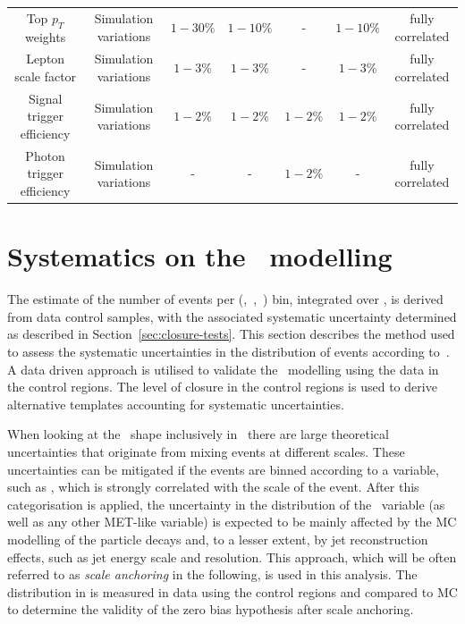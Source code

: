 \begin{landscape}
\begin{table}[h!]
\begin{tabular}{ ccccccc }
    Top $p_{T}$ weights & Simulation variations & $1-30\%$  & $1-10\%$ & - & $1-10\%$ & fully correlated \\
    Lepton scale factor & Simulation variations & $1-3\%$ & $1-3\%$ & - & $1-3\%$ & fully correlated \\
    Signal trigger efficiency & Simulation variations & $1-2\%$ & $1-2\%$ & $1-2\%$ & $1-2\%$ & fully correlated \\
    Photon trigger efficiency & Simulation variations & - & - & $1-2\%$ & - & fully correlated \\
    \hline
    \hline
  \end{tabular}
\end{table}
\end{landscape}


\section{Systematics on the \mht~modelling}
\label{sec:syst-on-shape}

The estimate of the number of events per (\njet,~\nb,~\scalht) bin,
integrated over \mht, is derived from data control samples, with
the associated systematic uncertainty determined as 
described in Section~\ref{sec:closure-tests}. This section
describes the method used to assess the systematic uncertainties in
the distribution of events according to~\mht. A data driven approach is
utilised to validate the \mht~modelling using the data in the control regions.
The level of closure in the control regions is used
to derive alternative templates accounting for systematic uncertainties.

When looking at the \mht~shape inclusively in \scalht~there are
large theoretical uncertainties that originate from mixing events
at different scales. These uncertainties can be mitigated if the events 
are binned according to a variable, such as \scalht, 
which is strongly correlated with the scale of the event. 
After this categorisation is applied, the uncertainty in 
the distribution of the \mht~variable
(as well as any other MET-like variable) is expected to be 
mainly affected by the MC modelling of the particle 
decays and, to a lesser extent, by jet reconstruction effects, 
such as jet energy scale and resolution. 
This approach, which will be often referred to as \textit{scale anchoring}
in the following, is used in this analysis. The distribution in \mht
is measured in data using the control regions and compared to MC
to determine the validity of the zero bias hypothesis after scale anchoring.

